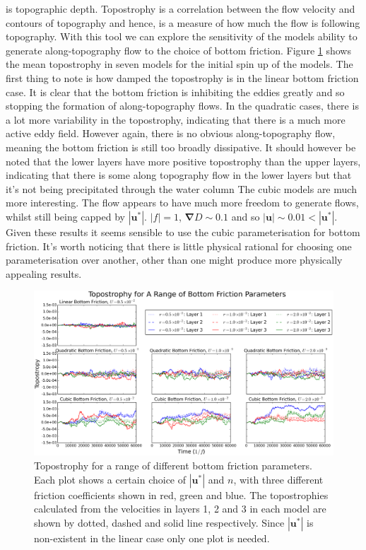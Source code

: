 \documentclass[10pt,a4paper]{report}
\begin{document}
  is topographic depth. Topostrophy is a correlation between the flow velocity
  and contours of topography and hence, is a measure of how much the flow is
  following topography. With this tool we can explore the sensitivity of the models
  ability to generate along-topography flow to the choice of bottom friction. 
  Figure \ref{fig:topostrophy} shows the mean topostrophy in seven models for the
  initial spin up of the models. The first thing to note is how damped the 
  topostrophy is in the linear
  bottom friction case. It is clear that the bottom friction is inhibiting the 
  eddies greatly and so stopping the formation of along-topography flows. In
  the quadratic cases, there is a lot more variability in the topostrophy, indicating
  that there is a much more active eddy field. However again, there is no obvious
  along-topography flow, meaning the bottom friction is still too broadly dissipative.
  It should however be noted that the lower layers have more positive topostrophy than
  the upper layers, indicating that there is some along topography flow in the lower 
  layers but that it's not being precipitated  through the water column
  The cubic models are much more interesting. The flow appears to have much more
  freedom to generate flows, whilst still being capped by $\left|\boldsymbol{u}^{\ast}\right|$. $\left|f\right| = 1$, $\boldsymbol{\nabla} D \sim 0.1$ and so $\left|\boldsymbol{u}\right| \sim 0.01 < \left|\boldsymbol{u}^{\ast}\right|$.
  Given these results it seems sensible to use the cubic parameterisation for bottom 
  friction. It's worth noticing that there is little physical rational for choosing
  one parameterisation over another, other than one might produce more physically 
  appealing results. 
  
  \begin{figure}
  	\centering
  	\includegraphics[width=\linewidth]{topostrophy}
  	\caption{Topostrophy for a range of different bottom friction parameters.
  		Each plot shows a certain choice of  $\left|\boldsymbol{u}^{\ast}\right|$
  		and $n$, with three different friction coefficients shown in red, green and blue.
  		The topostrophies calculated from the velocities in layers 1, 2 and 3 in each model
  		are shown by dotted, dashed and solid line respectively. Since 
  		$\left|\boldsymbol{u}^{\ast}\right|$ is non-existent in the linear case only
  		one plot is needed. }
  	\label{fig:topostrophy}
  \end{figure}
  
\end{document}
